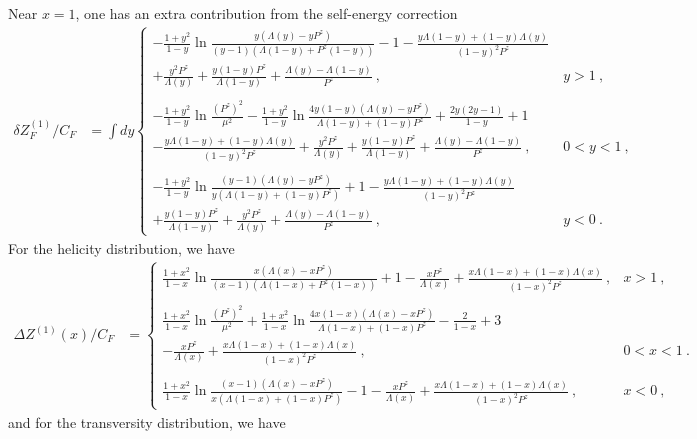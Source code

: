 Near $x=1$, one has an extra contribution from the self-energy correction
%
\begin{align}\label{selfnoexp}
\delta Z^{(1)}_F/C_F&=\int dy \left\{ \begin{array} {ll} -\frac{1+y^2}{1-y}\ln \frac{y(\Lambda(y)-y P^z)}{(y-1)(\Lambda(1-y)+P^z(1-y))}-1-\frac{y\Lambda(1-y)+(1-y)\Lambda(y)}{(1-y)^2 P^z}\ & \\
+\frac{y^2 P^z}{\Lambda(y)}+\frac{y(1-y)P^z}{\Lambda(1-y)}+\frac{\Lambda(y)-\Lambda(1-y)}{P^z}\ , & y>1\ , \\
\ \\
-\frac{1+y^2}{1-y}\ln\frac{(P^z)^2}{\mu^2}-\frac{1+y^2}{1-y}\ln \frac{4y(1-y)(\Lambda(y)-y P^z)}{\Lambda(1-y)+(1-y)P^z}+\frac{2y(2y-1)}{1-y}+1\ & \\
-\frac{y\Lambda(1-y)+(1-y)\Lambda(y)}{(1-y)^2P^z}+\frac{y^2 P^z}{\Lambda(y)}+\frac{y(1-y)P^z}{\Lambda(1-y)}+\frac{\Lambda(y)-\Lambda(1-y)}{P^z}\ , & 0<y<1\ , \\
\ \\
-\frac{1+y^2}{1-y}\ln \frac{(y-1)(\Lambda(y)-y P^z)}{y(\Lambda(1-y)+(1-y)P^z)}+1-\frac{y\Lambda(1-y)+(1-y)\Lambda(y)}{(1-y)^2P^z}\ & \\
+\frac{y(1-y)P^z}{\Lambda(1-y)}+\frac{y^2 P^z}{\Lambda(y)}+\frac{\Lambda(y)-\Lambda(1-y)}{P^z}\ , & y<0\ . \end{array} \right.
\end{align}
%
For the helicity distribution, we have
%
\begin{align}\label{helivertexnoexp}
\Delta  Z^{(1)}(x)/C_F&=\left\{ \begin{array} {ll} \frac{1+x^2}{1-x}\ln \frac{x(\Lambda(x)-x P^z)}{(x-1)(\Lambda(1-x)+P^z(1-x))}+1-\frac{x P^z}{\Lambda(x)}+\frac{x\Lambda(1-x)+(1-x)\Lambda(x)}{(1-x)^2 P^z}\ , & x>1\ , \\
\ \\
\frac{1+x^2}{1-x}\ln\frac{(P^z)^2}{\mu^2}+\frac{1+x^2}{1-x}\ln \frac{4x(1-x)(\Lambda(x)-x P^z)}{\Lambda(1-x)+(1-x)P^z}-\frac{2}{1-x}+3\ & \\
-\frac{x P^z}{\Lambda(x)}+\frac{x\Lambda(1-x)+(1-x)\Lambda(x)}{(1-x)^2 P^z}\ , & 0<x<1\ . \\
\ \\
\frac{1+x^2}{1-x}\ln \frac{(x-1)(\Lambda(x)-x P^z)}{x(\Lambda(1-x)+(1-x)P^z)}-1-\frac{x P^z}{\Lambda(x)}+\frac{x\Lambda(1-x)+(1-x)\Lambda(x)}{(1-x)^2P^z}\ , & x<0\ , \end{array} \right.
\end{align}
%
and for the transversity distribution, we have
%
